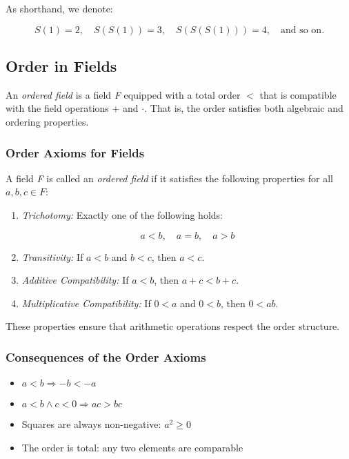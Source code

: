 As shorthand, we denote:

\[
	S(1) = 2, \quad S(S(1)) = 3, \quad S(S(S(1))) = 4, \quad \text{and so on.}
\]

\subsection{Order in Fields}

An \emph{ordered field} is a field \emph{F} equipped with a total order \( < \) that is compatible with 
the field operations + and \( \cdot \). That is, the order satisfies both algebraic and ordering 
properties.

\subsubsection{Order Axioms for Fields}

A field \emph{F} is called an \emph{ordered field} if it satisfies the following properties for all 
\( a, b, c \in F \):

\begin{enumerate}[label=\Roman*.]
    
	\item \emph{Trichotomy:} Exactly one of the following holds:
 
		  \[
 	   			a < b, \quad a = b, \quad a > b
    	   \]

    \item \emph{Transitivity:} If \( a < b \) and \( b < c \), then \( a < c \).

    \item \emph{Additive Compatibility:} If \( a < b \), then \( a + c < b + c \).

    \item \emph{Multiplicative Compatibility:} If \( 0 < a \) and \( 0 < b \), then \( 0 < ab \).

\end{enumerate}

These properties ensure that arithmetic operations respect the order structure.

\subsubsection{Consequences of the Order Axioms}

\begin{itemize}

	\item \( a < b \Rightarrow -b < -a \)

	\item \( a < b \land c < 0 \Rightarrow ac > bc \)

	\item Squares are always non-negative: \( a^2 \ge 0 \)

	\item The order is total: any two elements are comparable

\end{itemize}

